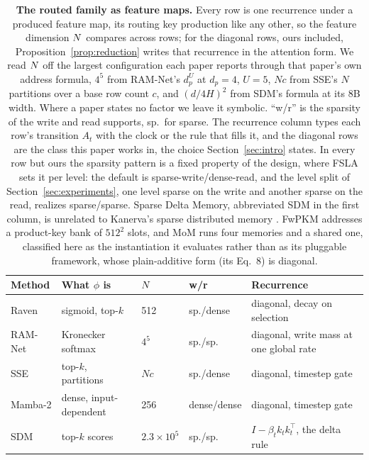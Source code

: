 \begin{table}[H]
\centering
\scriptsize
\caption{\textbf{The routed family as feature maps.} Every row is one recurrence under a produced feature map, its routing key production like any other, so the feature dimension $N$ compares across rows; for the diagonal rows, ours included, Proposition~\ref{prop:reduction} writes that recurrence in the attention form. We read $N$ off the largest configuration each paper reports through that paper's own address formula, $4^5$ from RAM-Net's $d_p^U$ at $d_p = 4$, $U = 5$, $Nc$ from SSE's $N$ partitions over a base row count $c$, and $(d/4H)^2$ from SDM's formula at its 8B width. Where a paper states no factor we leave it symbolic. ``w/r'' is the sparsity of the write and read supports, sp.\ for sparse. The recurrence column types each row's transition $A_t$ with the clock or the rule that fills it, and the diagonal rows are the class this paper works in, the choice Section~\ref{sec:intro} states. In every row but ours the sparsity pattern is a fixed property of the design, where FSLA sets it per level: the default is sparse-write/dense-read, and the level split of Section~\ref{sec:experiments}, one level sparse on the write and another sparse on the read, realizes sparse/sparse. Sparse Delta Memory, abbreviated SDM in the first column, is unrelated to Kanerva's sparse distributed memory \citep{kanerva1988sdm}. FwPKM addresses a product-key bank of $512^2$ slots, and MoM runs four memories and a shared one, classified here as the instantiation it evaluates rather than as its pluggable framework, whose plain-additive form (its Eq.~8) is diagonal.}
\label{tab:family}
\setlength{\tabcolsep}{3pt}
\begin{tabular}{@{}lllll@{}}
\toprule
Method & What $\phi$ is & $N$ & w/r & Recurrence \\
\midrule
Raven \citep{afzal2026raven}   & sigmoid, top-$k$       & 512               & sp./dense   & diagonal, decay on selection \\
RAM-Net \citep{xiao2026ramnet} & Kronecker softmax      & $4^5$             & sp./sp.\    & diagonal, write mass at one global rate \\
SSE \citep{sse2025}            & top-$k$, partitions    & $Nc$              & sp./dense   & diagonal, timestep gate \\
Mamba-2 \citep{dao2024mamba2}  & dense, input-dependent & 256               & dense/dense & diagonal, timestep gate \\
SDM \citep{cabannes2026sdm}    & top-$k$ scores         & $2.3{\times}10^5$ & sp./sp.\    & $I - \beta_t k_t k_t^\top$, the delta rule \\

\end{tabular}
\end{table}
